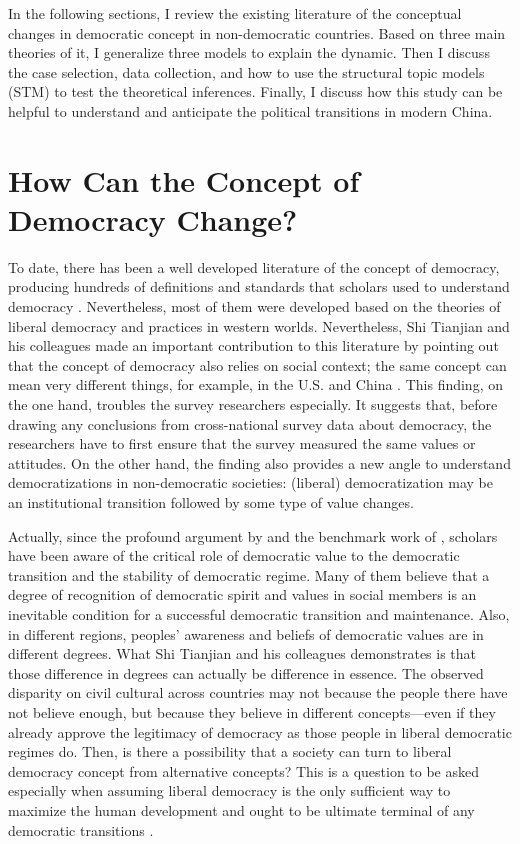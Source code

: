 \documentclass[abstracton,UTF8]{ctexart}
\begin{document}
In the following sections, I review the existing literature of the conceptual changes in democratic concept in non-democratic countries. Based on three main theories of it, I generalize three models to explain the dynamic. Then I discuss the case selection, data collection, and how to use the structural topic models (STM) to test the theoretical inferences. Finally, I discuss how this study can be helpful to understand and anticipate the political transitions in modern China.
	
\section{How Can the Concept of Democracy Change?}

To date, there has been a well developed literature of the concept of democracy, producing hundreds of definitions and standards that scholars used to understand democracy \citep[see, for example, ][]{Sen1999,Dahl1989,Schumpeter1947,Pateman1970,Karl1991a,Munck2014,Przeworski2000}. Nevertheless, most of them were developed based on the theories of liberal democracy and practices in western worlds. Nevertheless, Shi Tianjian and his colleagues made an important contribution to this literature by pointing out that the concept of democracy also relies on social context; the same concept can mean very different things, for example, in the U.S. and China \citep{Lu2014a,Shi2014}. This finding, on the one hand, troubles the survey researchers especially. It suggests that, before drawing any conclusions from cross-national survey data about democracy, the researchers have to first ensure that the survey measured the same values or attitudes. On the other hand, the finding also provides a new angle to understand democratizations in non-democratic societies: (liberal) democratization may be an institutional transition followed by some type of value changes.

Actually, since the profound argument by \citet{Weber1958} and the benchmark work of \citet{Almond1989}, scholars have been aware of the critical role of democratic value to the democratic transition and the stability of democratic regime. Many of them believe that a degree of recognition of democratic spirit and values in social members is an inevitable condition for a successful democratic transition and maintenance. Also, in different regions, peoples' awareness and beliefs of democratic values are in different degrees\citep[see, for example, ][]{1984,Putnam1994,PYE2006,Pye1992,Inglehart2005,Fuchs2007}. What Shi Tianjian and his colleagues demonstrates is that those difference in degrees can actually be difference in essence. The observed disparity on civil cultural across countries may not because the people there have not believe enough, but because they believe in different concepts---even if they already approve the legitimacy of democracy as those people in liberal democratic regimes do. Then, is there a possibility that a society can turn to liberal democracy concept from alternative concepts? This is a question to be asked especially when assuming liberal democracy is the only sufficient way to maximize the human development \citep{Dahl1989} and ought to be ultimate terminal of any democratic transitions \citep{Fukuyama2006}.
\end{document}

